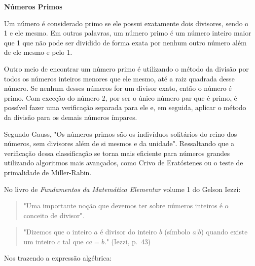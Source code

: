 \documentclass{article}
\begin{document}
\textbf{Números Primos}

\begin{flushleft}
Um número é considerado primo se ele possui exatamente dois divisores, sendo o 1 e ele mesmo. Em outras palavras, um número primo é um número inteiro maior que 1 que não pode ser dividido de forma exata por nenhum outro número além de ele mesmo e pelo 1.
\end{flushleft}

\begin{flushleft}
Outro meio de encontrar um número primo é utilizando o método da divisão por todos os números inteiros menores que ele mesmo, até a raiz quadrada desse número. Se nenhum desses números for um divisor exato, então o número é primo. Com exceção do número 2, por ser o único número par que é primo, é possível fazer uma verificação separada para ele e, em seguida, aplicar o método da divisão para os demais números ímpares.
\end{flushleft}

\begin{flushleft}
Segundo Gauss, "Os números primos são os indivíduos solitários do reino dos números, sem divisores além de si mesmos e da unidade". Ressaltando que a verificação dessa classificação se torna mais eficiente para números grandes utilizando algoritmos mais avançados, como Crivo de Eratóstenes ou o teste de primalidade de Miller-Rabin.
\end{flushleft}

\begin{flushleft}
No livro de \textit{Fundamentos da Matemática Elementar} volume 1 do Gelson Iezzi:
\end{flushleft}

\begin{quote}
    \setlength{\parindent}{4cm}
    \setlength{\baselineskip}{1.5\baselineskip}
    \fontsize{10}{10}\selectfont
    "Uma importante noção que devemos ter sobre números inteiros é o conceito de divisor".
\end{quote}

\newpage

\begin{quote}
    \setlength{\parindent}{4cm}
    \setlength{\baselineskip}{1.5\baselineskip}
    \fontsize{10}{10}\selectfont
    "Dizemos que o inteiro $a$ é divisor do inteiro $b$ (símbolo $a|b$) quando existe um inteiro $c$ tal que $ca = b$." (Iezzi, p.~43)\cite{iezzifundamentos}
\end{quote}

\begin{flushleft}
Nos trazendo a expressão algébrica:
\end{flushleft}
\end{document}

